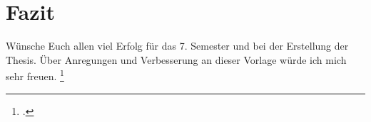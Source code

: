 \section{Fazit}
Wünsche Euch allen viel Erfolg für das 7. Semester und bei der Erstellung der Thesis. Über Anregungen und Verbesserung
an dieser Vorlage würde ich mich sehr freuen.
\footcite[Vgl. ][Seite 5]{Tanenbaum.2003}

